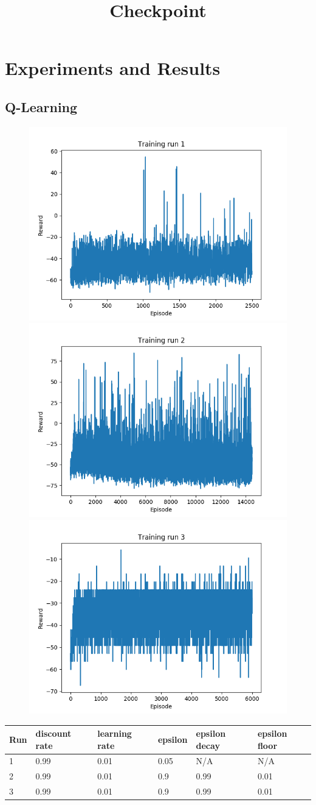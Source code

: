 \documentclass{article}
\begin{document}
\title{Checkpoint}

\section{Experiments and Results}

\subsection{Q-Learning}

\begin{figure}[htp]
\centering
	\includegraphics[width=.5\textwidth]{run_1_rewards.png}\hfill
	\includegraphics[width=.5\textwidth]{run_2_rewards.png}\hfill
	\includegraphics[width=.5\textwidth]{run_3_rewards.png}
\end{figure}


\begin{table}[htp]
\begin{tabular}{|l|l|l|l|l|l|}
\hline
Run & discount rate & learning rate & epsilon & epsilon decay & epsilon floor \\ \hline
1 & 0.99 & 0.01 & 0.05 & N/A & N/A \\ \hline
2 & 0.99 & 0.01 & 0.9 & 0.99 & 0.01 \\ \hline
3 & 0.99 & 0.01 & 0.9 & 0.99 & 0.01 \\ \hline
\end{tabular}
\end{table}
\end{document}
